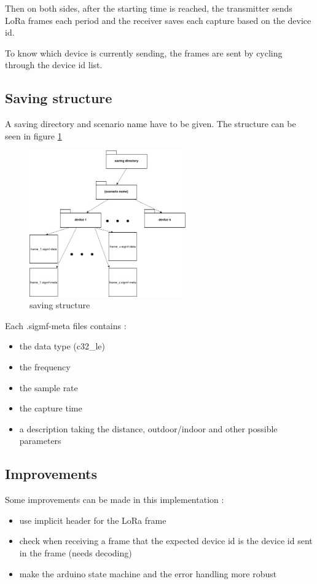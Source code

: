 \documentclass[a4paper, 12pt]{article}
\begin{document}
Then on both sides, after the starting time is reached, the transmitter sends LoRa frames each period and the receiver saves each capture based on the device id.

To know which device is currently sending, the frames are sent by cycling through the device id list.

\subsection{Saving structure}
A saving directory and scenario name have to be given. 
The structure can be seen in figure \ref{savestruct}

\begin{figure}[H]
  \begin{center}
    \includegraphics[width=0.6\textwidth]{images/save.jpg}
  \end{center}
  \caption{saving structure}\label{savestruct}
\end{figure}

Each .sigmf-meta files contains :
\begin{itemize}
  \item the data type (c32\_le)
  \item the frequency
  \item the sample rate
  \item the capture time
  \item a description taking the distance, outdoor/indoor and other possible parameters
\end{itemize}

\subsection{Improvements}
Some improvements can be made in this implementation :
\begin{itemize}
  \item use implicit header for the LoRa frame
  \item check when receiving a frame that the expected device id is the device id sent in the frame (needs decoding)
  \item make the arduino state machine and the error handling more robust  
\end{itemize}
\end{document}
